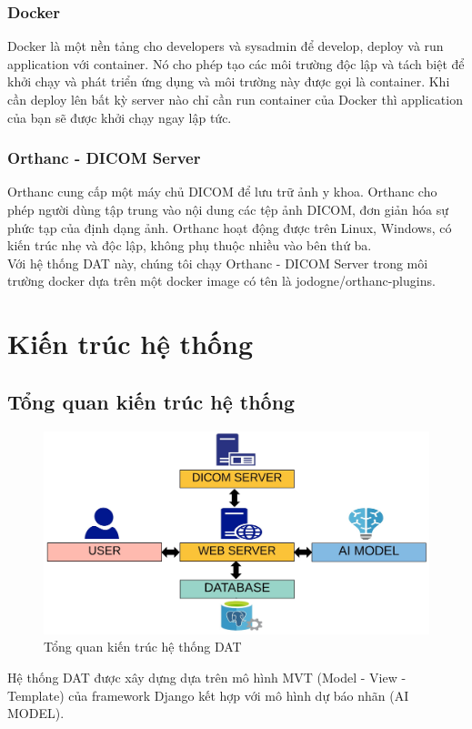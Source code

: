 \subsubsection{Docker}
Docker là một nền tảng cho developers và sysadmin để develop, deploy và run application với container. Nó cho phép tạo các môi trường độc lập và tách biệt để khởi chạy và phát triển ứng dụng và môi trường này được gọi là container. Khi cần deploy lên bất kỳ server nào chỉ cần run container của Docker thì application của bạn sẽ được khởi chạy ngay lập tức.

\subsubsection{Orthanc - DICOM Server}
Orthanc cung cấp một máy chủ DICOM để lưu trữ ảnh y khoa. Orthanc cho phép người dùng tập trung vào nội dung các tệp ảnh DICOM, đơn giản hóa sự phức tạp của định dạng ảnh. Orthanc hoạt động được trên Linux, Windows, có kiến trúc nhẹ và độc lập, không phụ thuộc nhiều vào bên thứ ba.\\
Với hệ thống DAT này, chúng tôi chạy Orthanc - DICOM Server trong môi trường docker dựa trên một docker image có tên là jodogne/orthanc-plugins. 

\section{Kiến trúc hệ thống}
\subsection{Tổng quan kiến trúc hệ thống}
\begin{figure}[H]
    \centering
    \includegraphics[width=14cm]{images/chapter-07-images/mvt-1.jpg}
    \caption{Tổng quan kiến trúc hệ thống DAT}
\end{figure}
Hệ thống DAT được xây dựng dựa trên mô hình MVT (Model - View - Template) của framework Django kết hợp với mô hình dự báo nhãn (AI MODEL).  

